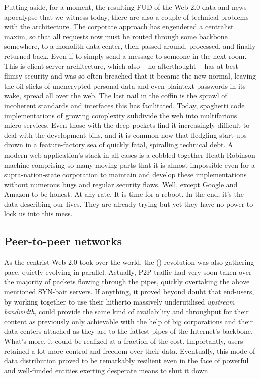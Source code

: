Putting aside, for a moment, the resulting FUD of the Web 2.0 data and news apocalypse that we witness today, there are also a couple of technical problems with the architecture. The corporate approach has engendered a centralist maxim, so that all requests now must be routed through some backbone somewhere, to a monolith data-center, then passed around, processed, and finally returned back. Even if to simply send a message to someone in the next room. This is client-server architecture, which also – no afterthought – has at best flimsy security and was so often breached that it became the new normal, leaving the oil-slicks of unencrypted personal data and even plaintext passwords in its wake, spread all over the web. The last nail in the coffin is the sprawl of incoherent standards and interfaces this has facilitated. Today, spaghetti code implementations of growing complexity subdivide the web into multifarious micro-services. Even those with the deep pockets find it increasingly difficult to deal with the development bills, and it is common now that fledgling start-ups drown in a feature-factory sea of quickly fatal, spiralling technical debt. A modern web application's stack in all cases is a cobbled together Heath-Robinson machine comprising so many moving parts that it is almost impossible even for a supra-nation-state corporation to maintain and develop these implementations without numerous bugs and regular security flaws. Well, except Google and Amazon to be honest. At any rate. It is time for a reboot. In the end, it's the data describing our lives. They are already trying but yet they have no power to lock us into this mess.


\subsection{Peer-to-peer networks \statusgreen}\label{sec:peer_to_peer}

As the centrist Web 2.0 took over the world, the  () revolution was also gathering pace, quietly evolving in parallel. Actually, P2P traffic had very soon taken over the majority of packets flowing through the pipes, quickly overtaking the above mentioned SYN-bait servers. If anything, it proved beyond doubt that end-users, by working together to use their hitherto massively underutilised \emph{upstream bandwidth}, could provide the same kind of availability and throughput for their content as previously only achievable with the help of big corporations and their  data centers attached as they are to the fattest pipes of the Internet's backbone. What's more, it could be realized at a fraction of the cost. Importantly, users retained a lot more control and freedom over their data. Eventually, this mode of data distribution proved to be remarkably resilient even in the face of powerful and well-funded entities exerting desperate means to shut it down.

